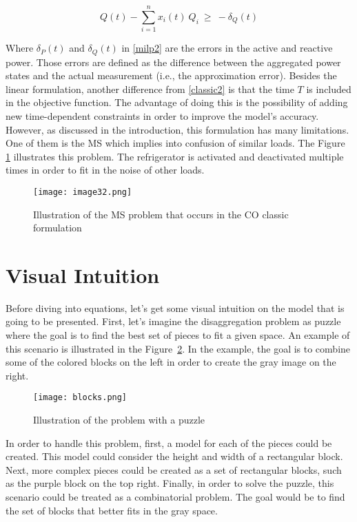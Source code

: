 \begin{equation} \label{eq7}
  Q(t) - \sum_{i = 1}^{n} x_i(t)\ Q_i \ \geq \ -\delta_Q(t)
\end{equation}

Where $\delta_P(t)$ and $\delta_Q(t)$ in \eqref{milp2} are the errors in the active and reactive power. Those errors are defined as the difference between the aggregated power states and the actual measurement (i.e., the approximation error). Besides the linear formulation, another difference from \eqref{classic2} is that the time $T$ is included in the objective function. The advantage of doing this is the possibility of adding new time-dependent constraints in order to improve the model's accuracy. However, as discussed in the introduction, this formulation has many limitations. One of them is the MS which implies into confusion of similar loads. The Figure \ref{image32} illustrates this problem. The refrigerator is activated and deactivated multiple times in order to fit in the noise of other loads. 


\begin{figure}[tb]
    \centering
    \texttt{[image: image32.png]}
    \caption{Illustration of the MS problem that occurs in the CO classic formulation}
    \label{image32}
\end{figure}





\section{Visual Intuition}
Before diving into equations, let's get some visual intuition on the model that is going to be presented. First, let's imagine the disaggregation problem as puzzle where the goal is to find the best set of pieces to fit a given space. An example of this scenario is illustrated in the Figure~\ref{blocks}. In the example, the goal is to combine some of the colored blocks on the left in order to create the gray image on the right. 

\begin{figure}[htb]
    \centering
    \texttt{[image: blocks.png]}
    \caption{Illustration of the problem with a puzzle}
    \label{blocks}
\end{figure}

In order to handle this problem, first, a model for each of the pieces could be created. This model could consider the height and width of a rectangular block. Next, more complex pieces could be created as a set of rectangular blocks, such as the purple block on the top right. Finally, in order to solve the puzzle, this scenario could be treated as a combinatorial problem. The goal would be to find the set of blocks that better fits in the gray space. 


